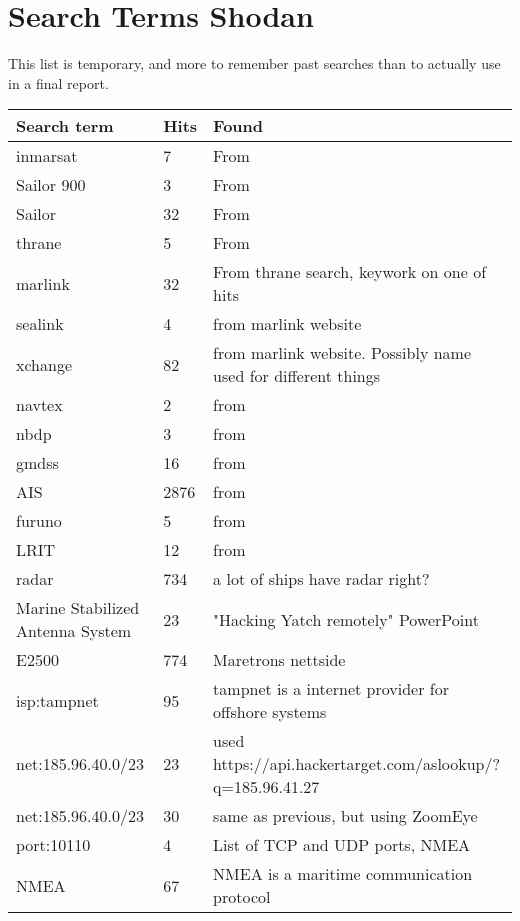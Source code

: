 

\section{Search Terms Shodan} \label{sec:search_term}
This list is temporary, and more to remember past searches than to actually use in a final report.
\begin{table}[H]
\centering
\begin{tabular}{|l|l|l|}
\hline
Search term & Hits & Found \\ \hline
inmarsat & 7 & From \cite{maritime_pen_test} \\ \hline
Sailor 900 & 3 & From \cite{maritime_pen_test} \\ \hline
Sailor & 32 & From \cite{maritime_pen_test} \\ \hline
thrane & 5 & From \cite{maritime_pen_test} \\ \hline
marlink & 32 &  From thrane search, keywork on one of hits \\ \hline
sealink & 4 &  from marlink website\\ \hline
xchange & 82 &  from marlink website. Possibly name used for different things\\ \hline
navtex & 2 &  from \cite{maritime_digitalization}\\ \hline
nbdp & 3 &  from \cite{maritime_digitalization}\\ \hline
gmdss & 16 &  from \cite{maritime_digitalization}\\ \hline
AIS & 2876 &  from \cite{maritime_digitalization}\\ \hline
furuno & 5 &  from \cite{maritime_digitalization}\\ \hline
LRIT & 12 &  from \cite{maritime_digitalization}\\ \hline
radar & 734 &  a lot of ships have radar right?\\ \hline
Marine Stabilized Antenna System & 23 &  "Hacking Yatch remotely" PowerPoint\\ \hline
E2500 & 774 &  Maretrons nettside\\ \hline
isp:tampnet & 95 &  tampnet is a internet provider for offshore systems\\ \hline
net:185.96.40.0/23 & 23 &  used https://api.hackertarget.com/aslookup/?q=185.96.41.27\\ \hline
net:185.96.40.0/23 & 30 &  same as previous, but using ZoomEye\\ \hline
port:10110 & 4 &  List of TCP and UDP ports, NMEA\\ \hline
NMEA & 67 &  NMEA is a maritime communication protocol\\ \hline


\end{tabular}
\end{table}
